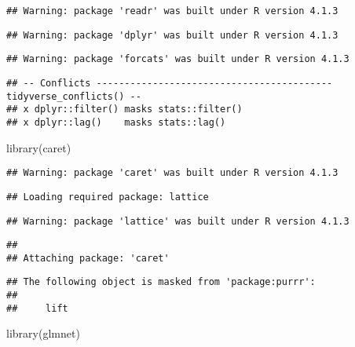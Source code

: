 \documentclass[
]{article}
\newenvironment{Shaded}{\begin{snugshade}}{\end{snugshade}}
\newcommand{\FunctionTok}[1]{\textcolor[rgb]{0.00,0.00,0.00}{#1}}
\newcommand{\NormalTok}[1]{#1}
\begin{document}
\begin{verbatim}
## Warning: package 'readr' was built under R version 4.1.3
\end{verbatim}

\begin{verbatim}
## Warning: package 'dplyr' was built under R version 4.1.3
\end{verbatim}

\begin{verbatim}
## Warning: package 'forcats' was built under R version 4.1.3
\end{verbatim}

\begin{verbatim}
## -- Conflicts ------------------------------------------ tidyverse_conflicts() --
## x dplyr::filter() masks stats::filter()
## x dplyr::lag()    masks stats::lag()
\end{verbatim}

\begin{Shaded}
\begin{Highlighting}[]
\FunctionTok{library}\NormalTok{(caret)}
\end{Highlighting}
\end{Shaded}

\begin{verbatim}
## Warning: package 'caret' was built under R version 4.1.3
\end{verbatim}

\begin{verbatim}
## Loading required package: lattice
\end{verbatim}

\begin{verbatim}
## Warning: package 'lattice' was built under R version 4.1.3
\end{verbatim}

\begin{verbatim}
## 
## Attaching package: 'caret'
\end{verbatim}

\begin{verbatim}
## The following object is masked from 'package:purrr':
## 
##     lift
\end{verbatim}

\begin{Shaded}
\begin{Highlighting}[]
\FunctionTok{library}\NormalTok{(glmnet)}
\end{Highlighting}
\end{Shaded}
\end{document}

